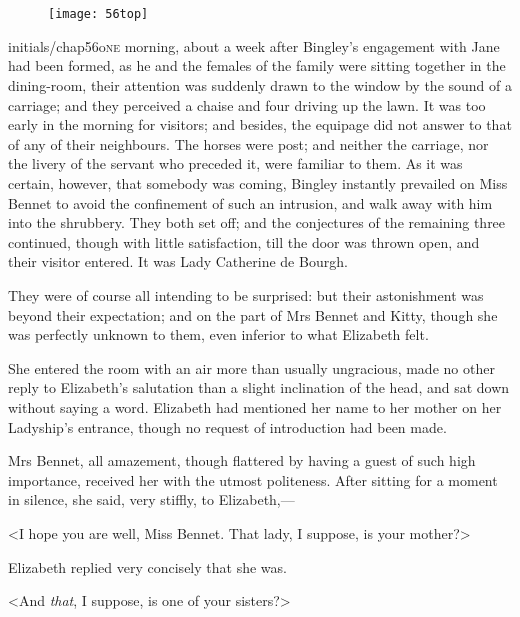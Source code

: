 \chapter[Chapter \thechapter]{}
	
	
\begin{figure}[t!]
\centering
\texttt{[image: 56top]}
\end{figure}


\lettrine[lines=6,image=true]{initials/chap56o}{ne}  morning, about a week after Bingley's engagement with Jane had been formed, as he and the females of the family were sitting together in the dining-room, their attention was suddenly drawn to the window by the sound of a carriage; and they perceived a chaise and four driving up the lawn. It was too early in the morning for visitors; and besides, the equipage did not answer to that of any of their neighbours. The horses were post; and neither the carriage, nor the livery of the servant who preceded it, were familiar to them. As it was certain, however, that somebody was coming, Bingley instantly prevailed on Miss Bennet to avoid the confinement of such an intrusion, and walk away with him into the shrubbery. They both set off; and the conjectures of the remaining three continued, though with little satisfaction, till the door was thrown open, and their visitor entered. It was Lady Catherine de Bourgh.

They were of course all intending to be surprised: but their astonishment was beyond their expectation; and on the part of Mrs Bennet and Kitty, though she was perfectly unknown to them, even inferior to what Elizabeth felt.

She entered the room with an air more than usually ungracious, made no other reply to Elizabeth's salutation than a slight inclination of the head, and sat down without saying a word. Elizabeth had mentioned her name to her mother on her Ladyship's entrance, though no request of introduction had been made.

Mrs Bennet, all amazement, though flattered by having a guest of such high importance, received her with the utmost politeness. After sitting for a moment in silence, she said, very stiffly, to Elizabeth,—

<I hope you are well, Miss Bennet. That lady, I suppose, is your mother?>

Elizabeth replied very concisely that she was.

<And \textit{that}, I suppose, is one of your sisters?>

